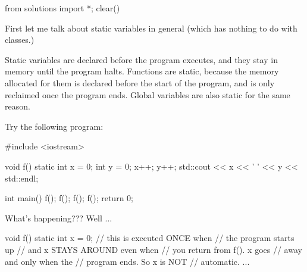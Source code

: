 \begin{python0}
from solutions import *; clear()
\end{python0}

First let me talk about static variables in general (which has nothing
to do with classes.)

Static variables are declared before the program executes, and they stay
in memory until the program halts. Functions are static, because the
memory allocated for them is declared before the start of the program,
and is only reclaimed once the program ends. Global variables are also
static for the same reason.

Try the following program:

\begin{consolethree}[escapeinside=||]
#include <iostream>

void f()
{
    static int x = 0;
    int y = 0;
    x++; y++;
    std::cout << x << ' ' << y << std::endl;
}

int main()
{
    f(); f(); f(); f();
    return 0;
}
\end{consolethree}

What's happening??? Well ...

\begin{consolethree}[escapeinside=||]
void f()
{
    static int x = 0; // this is executed ONCE when
                      // the program starts up
                      // and x STAYS AROUND even when
                      // you return from f(). x goes
                      // away and only when the
                      // program ends. So x is NOT
                      // automatic.
    ...
}
\end{consolethree}




